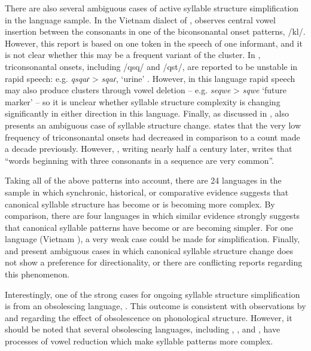   There are also several ambiguous cases of active syllable structure simplification in the language sample. In the Vietnam dialect of , \citep[127]{Clark2008} observes central vowel insertion between the consonants in one of the biconsonantal onset patterns, /kl/. However, this report is based on one token in the speech of one informant, and it is not clear whether this may be a frequent variant of the cluster. In , triconsonantal onsets, including /qsq/ and /qst/, are reported to be unstable in rapid speech: e.g. \textit{qsqaɾ} > \textit{sqaɾ}, ‘urine’ \citep[393]{Clairis1985}. However, in this language rapid speech may also produce clusters through vowel deletion -- e.g. \textit{seqwe} > \textit{sqwe} ‘future marker’ -- so it is unclear whether syllable structure complexity is changing significantly in either direction in this language. Finally, as discussed in ,  also presents an ambiguous case of syllable structure change. \citet[24]{Matteson1965} states that the very low frequency of triconsonantal onsets had decreased in comparison to a count made a decade previously. However, \citet[27]{Hanson2010}, writing nearly half a century later, writes that “words beginning with three consonants in a sequence are very common”.

  Taking all of the above patterns into account, there are 24 languages in the sample in which synchronic, historical, or comparative evidence suggests that canonical syllable structure has become or is becoming more complex. By comparison, there are four languages in which similar evidence strongly suggests that canonical syllable patterns have become or are becoming simpler. For one language (Vietnam ), a very weak case could be made for simplification. Finally,  and  present ambiguous cases in which canonical syllable structure change does not show a preference for directionality, or there are conflicting reports regarding this phenomenon.

  Interestingly, one of the strong cases for ongoing syllable structure simplification is from an obsolescing language, . This outcome is consistent with observations by \citet{Romaine2010} and \citet{Cook1989} regarding the effect of obsolescence on phonological structure. However, it should be noted that several obsolescing languages, including , , and , have processes of vowel reduction which make syllable patterns more complex.

